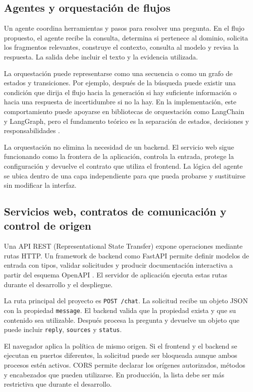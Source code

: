 \subsection{Agentes y orquestación de flujos}

Un agente coordina herramientas y pasos para resolver una pregunta. En el flujo propuesto, el agente recibe la consulta, determina si pertenece al dominio, solicita los fragmentos relevantes, construye el contexto, consulta al modelo y revisa la respuesta. La salida debe incluir el texto y la evidencia utilizada.

La orquestación puede representarse como una secuencia o como un grafo de estados y transiciones. Por ejemplo, después de la búsqueda puede existir una condición que dirija el flujo hacia la generación si hay suficiente información o hacia una respuesta de incertidumbre si no la hay. En la implementación, este comportamiento puede apoyarse en bibliotecas de orquestación como LangChain y LangGraph, pero el fundamento teórico es la separación de estados, decisiones y responsabilidades \citep{langchainDocs,langgraphDocs}.

La orquestación no elimina la necesidad de un backend. El servicio web sigue funcionando como la frontera de la aplicación, controla la entrada, protege la configuración y devuelve el contrato que utiliza el frontend. La lógica del agente se ubica dentro de una capa independiente para que pueda probarse y sustituirse sin modificar la interfaz.

\subsection{Servicios web, contratos de comunicación y control de origen}

Una API REST (Representational State Transfer) expone operaciones mediante rutas HTTP. Un framework de backend como FastAPI permite definir modelos de entrada con tipos, validar solicitudes y producir documentación interactiva a partir del esquema OpenAPI \citep{fastapiDocs}. El servidor de aplicación ejecuta estas rutas durante el desarrollo y el despliegue.

La ruta principal del proyecto es \texttt{POST /chat}. La solicitud recibe un objeto JSON con la propiedad \texttt{message}. El backend valida que la propiedad exista y que su contenido sea utilizable. Después procesa la pregunta y devuelve un objeto que puede incluir \texttt{reply}, \texttt{sources} y \texttt{status}.

El navegador aplica la política de mismo origen. Si el frontend y el backend se ejecutan en puertos diferentes, la solicitud puede ser bloqueada aunque ambos procesos estén activos. CORS permite declarar los orígenes autorizados, métodos y encabezados que pueden utilizarse. En producción, la lista debe ser más restrictiva que durante el desarrollo.

